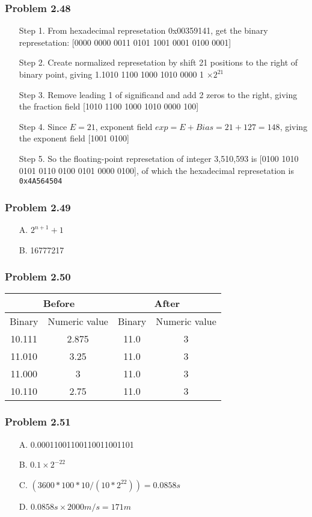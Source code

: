 \documentclass[a4paper]{article}
\begin{document}
\subsubsection*{Problem 2.48}
\begin{enumerate}
    \item [Step 1.] From hexadecimal represetation 0x00359141, get the binary represetation: [0000 0000 0011 0101 1001 0001 0100 0001]
    \item [Step 2.] Create normalized represetation by shift 21 positions to the right of binary point, giving 1.1010 1100 1000 1010 0000 1 $\times 2^{21}$
    \item [Step 3.] Remove leading 1 of significand and add 2 zeros to the right, giving the fraction field [1010 1100 1000 1010 0000 100]
    \item [Step 4.] Since $E = 21$, exponent field $exp = E + Bias = 21 + 127 = 148$, giving the exponent field [1001 0100]
    \item [Step 5.] So the floating-point represetation of integer 3,510,593 is [0100 1010 0101 0110 0100 0101 0000 0100], 
    of which the hexadecimal represetation is \tt{0x4A564504}
\end{enumerate}

\subsubsection*{Problem 2.49}
\begin{enumerate}
    \item [A.] $2^{n+1}+1$
    \item [B.] 16777217
\end{enumerate}

\subsubsection*{Problem 2.50}
\begin{tabular}{c|c|c|c}
    \multicolumn{2}{c|}{Before}&\multicolumn{2}{c}{After}\\\hline
    Binary&Numeric value&Binary&Numeric value\\\hline
    10.111&2.875&11.0&3\\
    11.010&3.25&11.0&3\\
    11.000&3&11.0&3\\
    10.110&2.75&11.0&3
\end{tabular}

\subsubsection*{Problem 2.51}
\begin{enumerate}
    \item [A.] 0.00011001100110011001101
    \item [B.] $0.1\times 2^{-22}$
    \item [C.] $(3600*100*10/(10*2^{22})) = 0.0858s$
    \item [D.] $0.0858s\times2000m/s=171m$
\end{enumerate}
\end{document}
